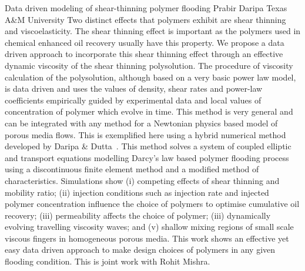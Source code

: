 \begin{addmargin}[2em]{0em}
\vspace{1.5ex}
\abs
{Data driven modeling of shear-thinning polymer flooding}
{Prabir Daripa}
{Texas A\&M University}
{Two distinct effects that polymers exhibit are shear thinning and viscoelasticity. The shear thinning effect is important as the polymers used in chemical enhanced oil recovery usually have this property. We propose a data driven approach to incorporate this shear thinning effect through an  effective dynamic viscosity of the shear thinning polysolution. The procedure of viscosity calculation of the polysolution, although based on a very basic power law model, is data driven and uses the values of density, shear rates and power-law coefficients empirically guided by experimental data and local values of concentration of polymer which evolve in time. This method is very general and can be integrated with any method for a Newtonian physics based model of porous media flows. This is exemplified here using a hybrid numerical method developed by Daripa \& Dutta~\cite{DFEMcode,daripa2017modeling,daripa2019convergence}. This method solves a system of coupled elliptic and transport equations modelling Darcy's law based polymer flooding process using a discontinuous finite element method and a modified method of characteristics. Simulations show (i) competing effects of shear thinning and mobility ratio; (ii) injection conditions such as injection rate and injected polymer concentration influence the choice of polymers to optimise cumulative oil recovery; (iii) permeability affects the choice of polymer; (iii) dynamically evolving travelling viscosity waves; and (v)  shallow mixing regions of small scale viscous fingers in homogeneous porous media. This work shows an effective yet easy data driven approach to make design choices of polymers in any given flooding condition. This is joint work with Rohit Mishra.}


\end{addmargin}
